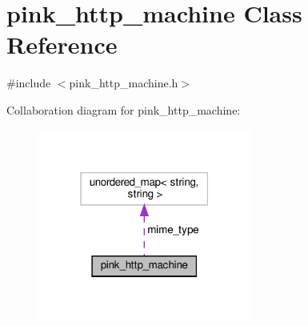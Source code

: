\hypertarget{classpink__http__machine}{}\section{pink\+\_\+http\+\_\+machine Class Reference}
\label{classpink__http__machine}


{\ttfamily \#include $<$pink\+\_\+http\+\_\+machine.\+h$>$}



Collaboration diagram for pink\+\_\+http\+\_\+machine\+:
\nopagebreak
\begin{figure}[H]
\begin{center}
\leavevmode
\includegraphics[width=199pt]{classpink__http__machine__coll__graph}
\end{center}
\end{figure}
